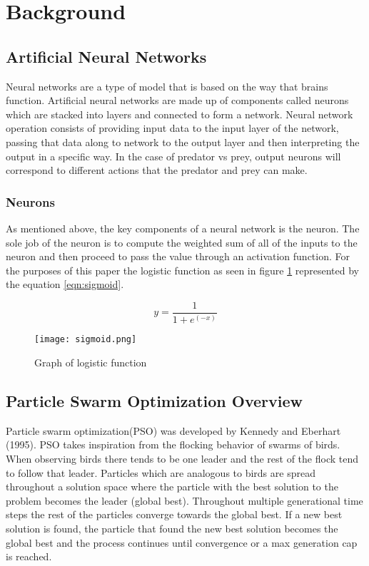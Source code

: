 \section{Background}

\subsection{Artificial Neural Networks}
Neural networks are a type of model that is based on the way that brains function. Artificial neural networks are made up of components called neurons which are stacked into layers and connected to form a network. Neural network operation consists of providing input data to the input layer of the network, passing that data along to network to the output layer and then interpreting the output in a specific way. In the case of predator vs prey, output neurons will correspond to different actions that the predator and prey can make.

\subsubsection{Neurons}
As mentioned above, the key components of a neural network is the neuron. The sole job of the neuron is to compute the weighted sum of all of the inputs to the neuron and then proceed to pass the value through an activation function. For the purposes of this paper the logistic function as seen in figure \ref{fig:sigmoid} represented by the equation \ref{eqn:sigmoid}.

\begin{equation}
	    y = \frac{1}{1+e^(-x)}
	    \label{eqn:sigmoid}
\end{equation}


\begin{figure}
  \centering
  \texttt{[image: sigmoid.png]}
  \caption{Graph of logistic function}
  \label{fig:sigmoid}
\end{figure}





\subsection{Particle Swarm Optimization Overview}
Particle swarm optimization(PSO) was developed by Kennedy and Eberhart (1995). PSO takes inspiration from the flocking behavior of swarms of birds. When observing birds there tends to be one leader and the rest of the flock tend to follow that leader. Particles which are analogous to birds are spread throughout a solution space where the particle with the best solution to the problem becomes the leader (global best). Throughout multiple generational time steps the rest of the particles converge towards the global best. If a new best solution is found, the particle that found the new best solution becomes the global best and the process continues until convergence or a max generation cap is reached.

